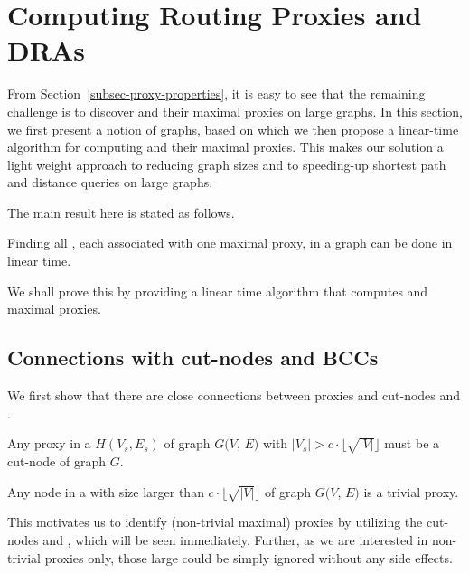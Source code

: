\section{Computing Routing Proxies and DRAs}
\label{sec-proxy-algorithms}
From Section~\ref{subsec-proxy-properties}, it is easy to see that the remaining challenge is to discover \dras and their maximal proxies on large graphs.
In this section, we first present a notion of  \bcsketch graphs, based on which we then propose a linear-time algorithm  for computing \dras and their maximal proxies. This makes our solution a light weight approach to reducing graph sizes and to  speeding-up shortest  path and distance queries on large graphs.



The main result here is stated as follows.

\begin{theorem}
\label{thm-compute-dras} Finding all \dras, each associated with one maximal proxy, in a graph can be done in linear time.
\end{theorem}


We shall prove this by providing a linear time algorithm that computes \dras and maximal proxies.


\subsection{Connections with cut-nodes and BCCs}
\label{subsec-connections}

We first show that there are close connections between proxies and cut-nodes and \bccs.



\begin{prop}
\label{prop-proxy-cut} Any proxy in a \cc $H(V_s, E_s)$ of graph $G(V$, $E)$ with $|V_s|>c\cdot\lfloor\sqrt{|V|}\rfloor$ must be a cut-node of graph $G$.
\end{prop}



\begin{prop}
\label{prop-large-bcc} Any node in a \bc with size larger than $c\cdot\lfloor\sqrt{|V|}\rfloor$ of graph $G(V$, $E)$ is a trivial proxy.
\end{prop}


This motivates us to identify (non-trivial maximal) proxies by utilizing the cut-nodes and \bccs, which will be seen immediately.
Further, as we are interested in non-trivial proxies only, those large \bccs could be simply ignored without any side effects.


